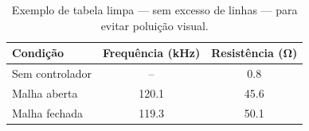 \documentclass[brazilian, a4paper, 11pt]{article}
\begin{document}
\begin{table}[hbpt]
\centering
\caption{Exemplo de tabela limpa --- sem excesso de linhas --- para evitar poluição visual.}
\label{tab:exemplo}
\begin{tabular}{lcc}
\toprule
Condição & Frequência (\si{kHz}) & Resistência (\si{\ohm}) \\
\midrule
Sem controlador & -- & \num{0.8} \\
Malha aberta & \num{120.1} & \num{45.6} \\
Malha fechada & \num{119.3} & \num{50.1} \\
\bottomrule
\end{tabular}
\end{table}

\printbibliography
\end{document}
